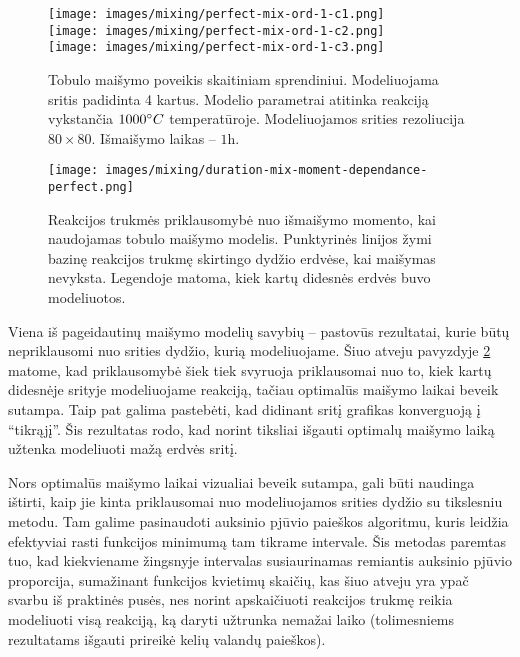 \begin{figure}[h!]
  \centering
  \texttt{[image: images/mixing/perfect-mix-ord-1-c1.png]} \\ 
  \texttt{[image: images/mixing/perfect-mix-ord-1-c2.png]} \\
  \texttt{[image: images/mixing/perfect-mix-ord-1-c3.png]}
  \caption{Tobulo maišymo poveikis skaitiniam sprendiniui. Modeliuojama sritis padidinta 4 kartus. Modelio parametrai atitinka reakciją vykstančia $1000\degree C$ temperatūroje. Modeliuojamos srities rezoliucija $80\times80$. Išmaišymo laikas -- $1\text{h}. $}
  \label{fig:perfect-mix-larger-example}
\end{figure}

\begin{figure}[h!]
  \centering
  \texttt{[image: images/mixing/duration-mix-moment-dependance-perfect.png]}
  \caption{Reakcijos trukmės priklausomybė nuo išmaišymo momento, kai naudojamas tobulo maišymo modelis. Punktyrinės linijos žymi bazinę reakcijos trukmę skirtingo dydžio erdvėse, kai maišymas nevyksta. Legendoje matoma, kiek kartų didesnės erdvės buvo modeliuotos.}
  \label{fig:duration-mix-moment-perfect}
\end{figure}

Viena iš pageidautinų maišymo modelių savybių -- pastovūs rezultatai, kurie būtų nepriklausomi nuo srities dydžio, kurią modeliuojame. Šiuo atveju pavyzdyje \ref{fig:duration-mix-moment-perfect} matome, kad priklausomybė šiek tiek svyruoja priklausomai nuo to, kiek kartų didesnėje srityje modeliuojame reakciją, tačiau optimalūs maišymo laikai beveik sutampa. Taip pat galima pastebėti, kad didinant sritį grafikas konverguoją į \enquote{tikrąjį}. Šis rezultatas rodo, kad norint tiksliai išgauti optimalų maišymo laiką užtenka modeliuoti mažą erdvės sritį. 

Nors optimalūs maišymo laikai vizualiai beveik sutampa, gali būti naudinga ištirti, kaip jie kinta priklausomai nuo modeliuojamos srities dydžio su tikslesniu metodu. Tam galime pasinaudoti auksinio pjūvio paieškos algoritmu, kuris leidžia efektyviai rasti funkcijos minimumą tam tikrame intervale. Šis metodas paremtas tuo, kad kiekviename žingsnyje intervalas susiaurinamas remiantis auksinio pjūvio proporcija, sumažinant funkcijos kvietimų skaičių, kas šiuo atveju yra ypač svarbu iš praktinės pusės, nes norint apskaičiuoti reakcijos trukmę reikia modeliuoti visą reakciją, ką daryti užtrunka nemažai laiko (tolimesniems rezultatams išgauti prireikė kelių valandų paieškos). 

